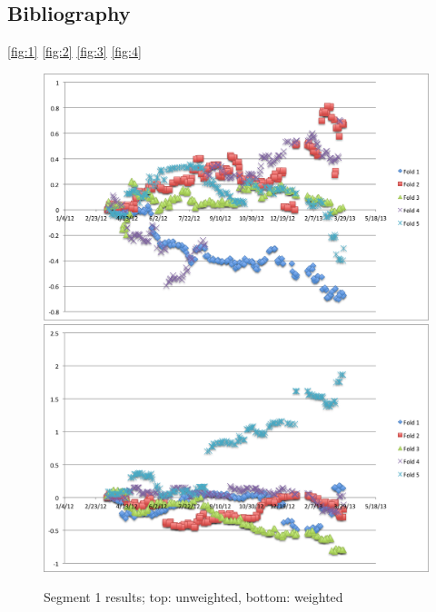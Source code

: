 \documentclass[11pt,letterpaper]{article}
\newcommand{\blue}[1]{\textcolor{RoyalBlue}{#1}}
\newcommand{\instructions}[1]{\blue{\textit{#1}}}
\begin{document}
\begin{itemize}

\section*{Bibliography}
{}


\eqref{fig:1}
\eqref{fig:2}
\eqref{fig:3}
\eqref{fig:4}

\begin{figure}
   	\includegraphics[width=14cm]{images/unweighted-exp-0.png}
    	\qquad
    	\includegraphics[width=14cm]{images/weighted-exp-0.png}
    	\caption{Segment 1 results; top: unweighted, bottom: weighted }%
    	\label{fig:1}
\end{figure}


\end{itemize}
\end{document}
